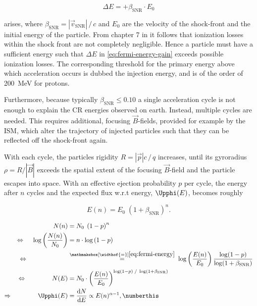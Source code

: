 \begin{equation}
\label{eq:fermi-energy-gain}
\Delta E = +\beta_\text{SNR} \cdot E_0
\end{equation}

arises, where $\beta_\text{SNR} = |\vec{v}_\text{SNR}|\,/\,c$ and $E_0$ are the velocity of the shock-front and the initial energy of the particle. From chapter 7 
in \cite{fermi1949origin} it follows that ionization losses within the shock front are not completely negligible. Hence a particle must have a sufficient energy 
such that $\Delta E$ in \autoref{eq:fermi-energy-gain} exceeds possible ionization losses. The corresponding threshold for the primary energy above which 
acceleration occurs is dubbed the injection energy, and is of the order of \SI{200}{\mega\electronvolt} for protons. 

Furthermore, because typically $\beta_\text{SNR} \leq 0.10$ a single acceleration cycle is not enough to explain the CR energies observed on earth. Instead, 
multiple cycles are needed. This requires additional, focusing $\vec{B}$-fields, provided for example by the ISM, which alter the trajectory of injected particles 
such that they can be reflected off the shock-front again.

With each cycle, the particles rigidity $R = |\vec{p}|c\,/\,q$ increases, until its gyroradius $\rho = R / |\vec{B}|$ exceeds the spatial extent of the focusing 
$\vec{B}$-field and the particle escapes into space. With an effective ejection probability $p$ per cycle, the energy after $n$ cycles and the expected flux w.r.t
energy, $\Upphi(E)$, becomes roughly

\begin{equation}
\label{eq:fermi-energy}
E(n) = E_0\;\left( 1 + \beta_\text{SNR} \right)^n.
\end{equation}

\begin{align*}
                                                        N(n) &= N_0 \;\left( 1 - p \right)^n \\
\Leftrightarrow\;\;\;\;\,\log\left( \frac{N(n)}{N_0} \right) &= n\cdot\log\left( 1-p \right) \\ 
\Leftrightarrow\qquad\qquad\qquad\;\;&\stackrel{\mathmakebox[\widthof{=}]{\eqref{eq:fermi-energy}}}{=}\;\log\left( \frac{E(n)}{E_0} \right) 
\frac{\log(1-p)}{\log(1+\beta_\text{SNR})} \\
\Leftrightarrow\qquad\qquad                             N(E) &= N_0\cdot\left( \frac{E(n)}{E_0} \right)^{\log(1 - p)\;/\;\log(1 + \beta_\text{SNR})} \\
\Rightarrow \qquad\qquad                           \Upphi(E) &= \frac{ \text{d}N }{ \text{d}E } \propto E(n)^{\alpha - 1}, \numberthis\label{eq:fermi-spectrum}
\end{align*}

